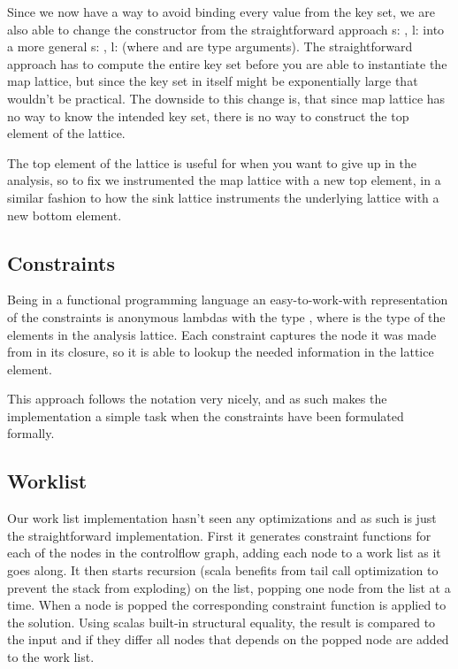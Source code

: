 Since we now have a way to avoid binding every value from the key set, we are also able to change the constructor from the straightforward approach s: , l:  into a more general s: , l:  (where  and  are type arguments). The straightforward approach has to compute the entire key set before you are able to instantiate the map lattice, but since the key set in itself might be exponentially large that wouldn't be practical. The downside to this change is, that since map lattice has no way to know the intended key set, there is no way to construct the top element of the lattice.

The top element of the lattice is useful for when you want to give up in the analysis, so to fix we instrumented the map lattice with a new top element, in a similar fashion to how the sink lattice instruments the underlying lattice with a new bottom element. 

\subsection{Constraints}

Being in a functional programming language an easy-to-work-with representation of the constraints is anonymous lambdas with the type , where  is the type of the elements in the analysis lattice. Each constraint captures the node it was made from in its closure, so it is able to lookup the needed information in the lattice element.

This approach follows the notation very nicely, and as such makes the implementation a simple task when the constraints have been formulated formally.

\subsection{Worklist}
Our work list implementation hasn't seen any optimizations and as such is just the straightforward implementation. First it generates constraint functions for each of the nodes in the controlflow graph, adding each node to a work list as it goes along. It then starts recursion (scala benefits from tail call optimization to prevent the stack from exploding) on the list, popping one node from the list at a time. When a node is popped the corresponding constraint function is applied to the solution. Using scalas built-in structural equality, the result is compared to the input and if they differ all nodes that depends on the popped node are added to the work list.

